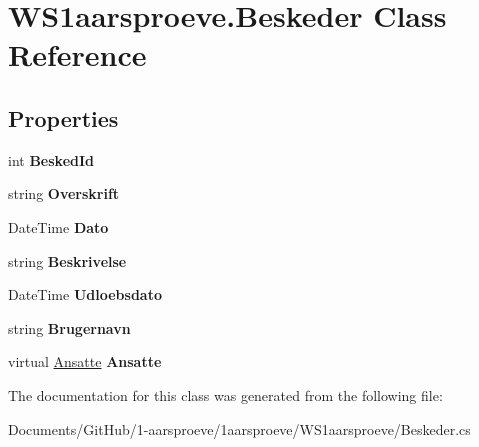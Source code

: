 \hypertarget{class_w_s1aarsproeve_1_1_beskeder}{}\section{W\+S1aarsproeve.\+Beskeder Class Reference}
\label{class_w_s1aarsproeve_1_1_beskeder}
\subsection*{Properties}
\begin{DoxyCompactItemize}
\item 
\hypertarget{class_w_s1aarsproeve_1_1_beskeder_afb5d4d4890212acdd20b9a9144acb8c9}{}int {\bfseries Besked\+Id}\label{class_w_s1aarsproeve_1_1_beskeder_afb5d4d4890212acdd20b9a9144acb8c9}

\item 
\hypertarget{class_w_s1aarsproeve_1_1_beskeder_a26ab07ec2aa00e799717e7107da39ac3}{}string {\bfseries Overskrift}\label{class_w_s1aarsproeve_1_1_beskeder_a26ab07ec2aa00e799717e7107da39ac3}

\item 
\hypertarget{class_w_s1aarsproeve_1_1_beskeder_a77960affa3d607c79ad2d36416e82990}{}Date\+Time {\bfseries Dato}\label{class_w_s1aarsproeve_1_1_beskeder_a77960affa3d607c79ad2d36416e82990}

\item 
\hypertarget{class_w_s1aarsproeve_1_1_beskeder_a30ad86441d04c5d0c5e1a605c61d6d06}{}string {\bfseries Beskrivelse}\label{class_w_s1aarsproeve_1_1_beskeder_a30ad86441d04c5d0c5e1a605c61d6d06}

\item 
\hypertarget{class_w_s1aarsproeve_1_1_beskeder_a9f84b7510fee3032f3649e9aa6283e48}{}Date\+Time {\bfseries Udloebsdato}\label{class_w_s1aarsproeve_1_1_beskeder_a9f84b7510fee3032f3649e9aa6283e48}

\item 
\hypertarget{class_w_s1aarsproeve_1_1_beskeder_ac062915cd5f28e2122bce255b63e7e74}{}string {\bfseries Brugernavn}\label{class_w_s1aarsproeve_1_1_beskeder_ac062915cd5f28e2122bce255b63e7e74}

\item 
\hypertarget{class_w_s1aarsproeve_1_1_beskeder_ad5f19abc95df1b1b1a015a5850a4e3d9}{}virtual \hyperlink{class_w_s1aarsproeve_1_1_ansatte}{Ansatte} {\bfseries Ansatte}\label{class_w_s1aarsproeve_1_1_beskeder_ad5f19abc95df1b1b1a015a5850a4e3d9}

\end{DoxyCompactItemize}


The documentation for this class was generated from the following file\+:\begin{DoxyCompactItemize}
\item 
Documents/\+Git\+Hub/1-\/aarsproeve/1aarsproeve/\+W\+S1aarsproeve/Beskeder.\+cs\end{DoxyCompactItemize}
